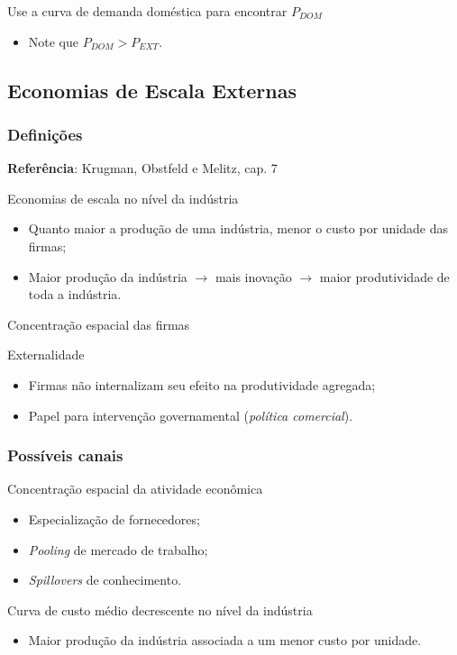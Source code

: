 \documentclass[a4paper,12pt]{article}[abntex2]
\begin{document}
Use a curva de demanda doméstica para encontrar \( P_{DOM} \)
\begin{itemize}
    \item Note que \( P_{DOM} > P_{EXT} \).
\end{itemize}

\subsection{\textbf{Economias de Escala Externas}}
\subsubsection{\textbf{Definições}}

\textbf{Referência}: Krugman, Obstfeld e Melitz, cap. 7

Economias de escala no nível da indústria
\begin{itemize}
    \item Quanto maior a produção de uma indústria, menor o custo por unidade das firmas;
    \item Maior produção da indústria \( \rightarrow \) mais inovação \( \rightarrow \) maior produtividade de toda a indústria.
\end{itemize}

Concentração espacial das firmas

Externalidade
\begin{itemize}
    \item Firmas não internalizam seu efeito na produtividade agregada;
    \item Papel para intervenção governamental (\textit{política comercial}).
\end{itemize}

\subsubsection{\textbf{Possíveis canais}}
Concentração espacial da atividade econômica
\begin{itemize}
    \item Especialização de fornecedores;
    \item \textit{Pooling} de mercado de trabalho;
    \item \textit{Spillovers} de conhecimento.
\end{itemize}

Curva de custo médio decrescente no nível da indústria
\begin{itemize}
    \item Maior produção da indústria associada a um menor custo por unidade.
\end{itemize}
\end{document}
